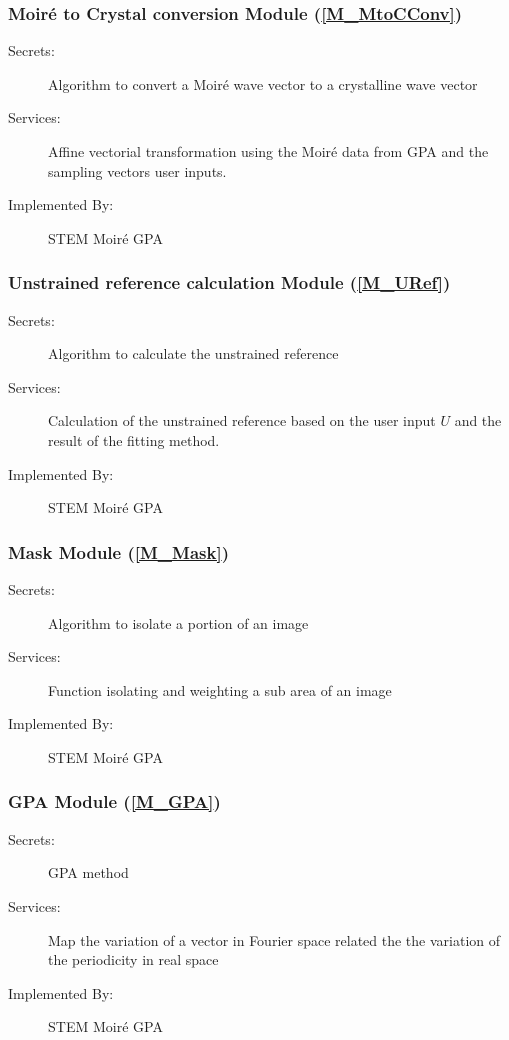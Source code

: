 \documentclass[12pt, titlepage]{article}
\newcommand{\progname}{STEM Moir{\'e} GPA}
\begin{document}
\subsubsection{Moir{\'e} to Crystal conversion Module (\cref{M_MtoCConv})}

\begin{description}
\item[Secrets:] Algorithm to convert a Moir{\'e} wave vector to a crystalline wave vector
\item[Services:] Affine vectorial transformation using the Moir{\'e} data from GPA and the sampling vectors user inputs.
\item[Implemented By:] \progname{}
\end{description}

\subsubsection{Unstrained reference calculation Module (\cref{M_URef})}

\begin{description}
\item[Secrets:] Algorithm to calculate the unstrained reference
\item[Services:] Calculation of the unstrained reference based on the user input $U$ and the result of the fitting method.
\item[Implemented By:] \progname{}
\end{description}

\subsubsection{Mask Module (\cref{M_Mask})}

\begin{description}
\item[Secrets:] Algorithm to isolate a portion of an image
\item[Services:] Function isolating and weighting a sub area of an image
\item[Implemented By:] \progname{}
\end{description}

\subsubsection{GPA Module (\cref{M_GPA})}

\begin{description}
\item[Secrets:] GPA method
\item[Services:] Map the variation of a vector in Fourier space related the the variation of the periodicity in real space
\item[Implemented By:] \progname{}
\end{description}
\end{document}
